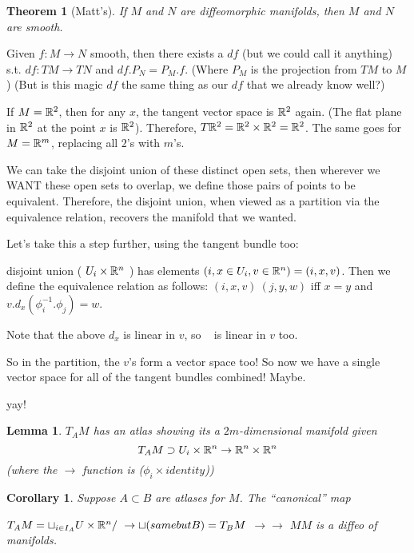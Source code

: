 \documentclass[11pt]{amsbook}
\newenvironment{dateenv}{
	\vspace{1em}
}{
	\vspace{1em}
}
\newcommand{\mydate}[4]{
	\newdate{#1}{#2}{#3}{#4}
	\begin{dateenv}
		\hfill\displaydate{#1}
	\end{dateenv}
}
\theoremstyle{mystyle} \newtheorem{thrm}[thm]{Theorem}
\theoremstyle{mystyle} \newtheorem{defi}[thm]{Definition}
\theoremstyle{mystyle} \newtheorem{coro}[thm]{Corollary}
\theoremstyle{mystyle} \newtheorem{propo}[thm]{Proposition}
\theoremstyle{mystyle} \newtheorem{lemm}[thm]{Lemma}
\numberwithin{thm}{section}
\newcommand{\x}{\times}
\begin{document}
\begin{thrm}[Matt's]
	If $M$ and $N$ are diffeomorphic manifolds, then $M$ and $N$ are smooth.
\end{thrm}


\mydate{d1}{21}{9}{2016}

Given $f:M \to N$ smooth, then there exists a $df$ (but we could call it anything) s.t. $df : TM \to TN$ and $df.P_N = P_M.f$.  (Where $P_M$ is the projection from $TM$ to $M$)  (But is this magic $df$ the same thing as our $df$ that we already know well?)

\begin{example}
	If $M = {\mathbb R}^2$, then for any $x$, the tangent vector space is ${\mathbb R}^2$ again.  (The flat plane in ${\mathbb R}^2$ at the point $x$ is ${\mathbb R}^2$).  Therefore, $T{\mathbb R}^2 = {\mathbb R}^2 \times {\mathbb R}^2 = {\mathbb R}^2$.  The same goes for $M = {\mathbb R}^m$, replacing all $2$'s with $m$'s.
\end{example}

We can take the disjoint union of these distinct open sets, then wherever we WANT these open sets to overlap, we define those pairs of points to be equivalent.  Therefore, the disjoint union, when viewed as a partition via the equivalence relation, recovers the manifold that we wanted.

Let's take this a step further, using the tangent bundle too:

disjoint union ( $U_i \times {\mathbb R}^n$ ) has elements $(i, x \in U_i, v \in {\mathbb R}^n) = (i, x, v)$.
Then we define the equivalence relation as follows:
$(i, x, v) ~ (j, y, w)$ iff $x=y$ and $v.d_x(\phi_i^{-1}.\phi_j) = w$.

Note that the above $d_x$ is linear in $v$, so ~ is linear in $v$ too.

So in the partition, the $v$'s form a vector space too!  So now we have a single vector space for all of the tangent bundles combined!  Maybe.

yay!

\begin{lemm}
	$T_A M$ has an atlas showing its a $2m$-dimensional manifold given
	$$T_A M \supset U_i \x \R^n \to \R^n \x \R^n$$ (where the $\to$ function is ($\phi_i \times identity$))
\end{lemm}
\begin{coro}
	Suppose $A \subset B$ are atlases for $M$.  The ``canonical'' map

	$T_A M = \sqcup_{i \in I_A} U \times {\mathbb R}^n/~ \to \sqcup (same but B) = T_B M$
				$\to										\to$
				$M 										M$
	is a diffeo of manifolds.
\end{coro}
\end{document}
